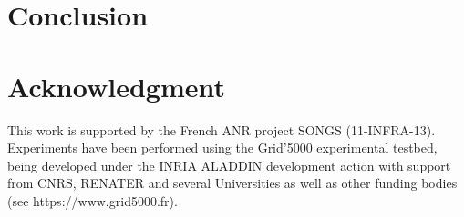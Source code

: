 \documentclass[conference]{IEEEtran}
\begin{document}
\section{Conclusion}
\label{sec:conclusion}





\section*{Acknowledgment}
This work is supported by the French ANR project SONGS (11-INFRA-13).
Experiments have been performed using the Grid'5000
experimental testbed, being developed under the INRIA ALADDIN development
 action with support from CNRS, RENATER and several Universities as well as
 other funding bodies (see https://www.grid5000.fr).



\end{document}
